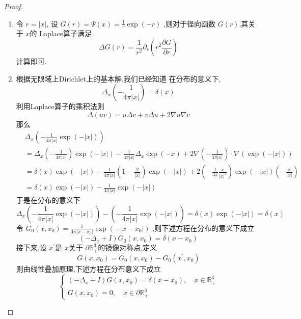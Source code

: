\documentclass[../../main.tex]{subfiles}
\begin{document}
\begin{proof}
 \begin{enumerate}
   \item 令 \(  r= \left| x \right|   \), 设 \(  G\left( r \right)= \Psi \left( x \right)= \frac{1 }{r }\exp \left( -r \right)      \) ,则对于径向函数 \(  G\left( r \right)   \),其关于 \(  x  \)的 Laplace算子满足 \[
    \Delta G\left( r \right)=  \frac{1 }{r^{2} } \partial _{r}\left( r ^{2}\frac{\partial G}{\partial r} \right)  
   \] 计算即可.
   \item 

   根据无限域上Dirichlet上的基本解,我们已经知道 在分布的意义下,\[
    \Delta _{x}\left( -\frac{1 }{4\pi \left| x \right|  }  \right) =  \delta \left( x \right) 
   \]利用Laplace算子的乘积法则 \[
    \Delta \left( uv \right)= u \Delta v+ v \Delta u+ 2 \nabla u \nabla v 
   \]那么 \[
   \begin{aligned}
    &\Delta _{x}\left( -\frac{1 }{4\pi \left| x \right|  }\exp \left( -\left| x \right| \right)   \right)\\ 
     &=  \Delta _{x}\left( -\frac{1 }{4\pi \left| x \right|  }  \right)\exp \left( -\left| x \right|  \right)-\frac{1 }{4\pi \left| x \right|  } \Delta _{x}\exp \left( -x \right)+2  \nabla \left( -\frac{1 }{4\pi \left| x \right|  }  \right)\cdot  \nabla \left( \exp \left( -\left| x \right|  \right)  \right)       \\ 
      &=  \delta \left( x \right)\exp \left( -\left| x \right|  \right)-\frac{1 }{4\pi \left| x \right|  }   \left( 1-\frac{2}{\left| x \right|  }  \right) \exp \left( -\left| x \right|  \right) + 2  \left( -\frac{1 }{4\pi  }\frac{x }{\left| x \right|^{3}  }   \right) \exp \left( -\left| x \right|  \right)\left( -\frac{x }{ \left| x \right| }  \right)  \\ 
       &=  \delta \left( x \right)\exp \left( -\left| x \right|  \right)-\frac{1 }{4\pi \left| x \right|  }\exp \left( -\left| x \right|  \right)    
   \end{aligned}
   \]
于是在分布的意义下
   \[
   \Delta _{x}\left( -\frac{1 }{4\pi \left| x \right|  }\exp \left( -\left| x \right| \right)   \right)-\left( -\frac{1 }{4\pi \left| x \right|  }\exp \left( -\left| x \right|  \right)   \right)=  \delta \left( x \right)  \exp \left( -\left| x \right|  \right)=  \delta \left( x \right)  
   \]令 \(  G_0\left( x,x_0 \right)   = \frac{1 }{4\pi \left| x-x_0 \right|  }\exp \left( -\left| x-x_0 \right|  \right)  \) ,则下述方程在分布的意义下成立 \[
 \left( - \Delta _{x}+ I \right) G_0\left( x,x_0 \right)=   \delta \left( x-x_0 \right)  
   \]接下来,设 \(  x^{\prime}   \)是 \(  x  \)关于 \(   \partial \mathbb{R} _{+ }^{3}  \)的镜像对称点,定义 \[
   G\left( x,x_0 \right)= G_0\left( x,x_0 \right)-G_0\left( x^{\prime} ,x_0 \right)   
   \]   则由线性叠加原理,下述方程在分布意义下成立 \[
   \begin{cases} \left( - \Delta _{x}+ I \right)G\left( x,x_0 \right)=  \delta \left( x-x_0 \right),\quad x\in \mathbb{R} _{+ }^{3}\\ 
    G\left( x,x_0 \right)= 0,\quad x\in  \partial\mathbb{R}  _{+ }^{3}     \end{cases} 
   \]


\end{enumerate}
\end{proof}
\end{document}
